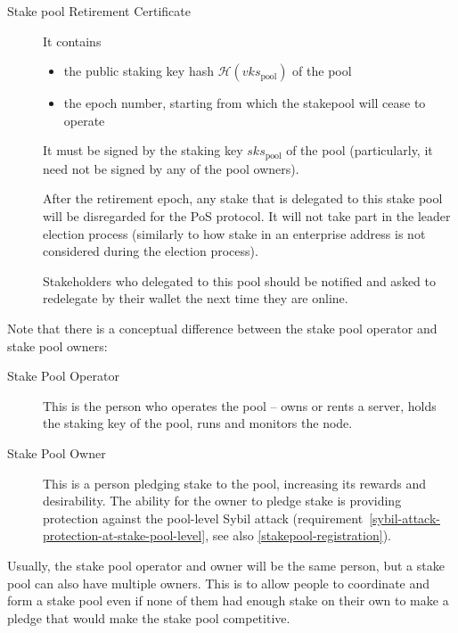 \documentclass[11pt,a4paper]{article}
\begin{document}
\begin{description}
\item[Stake pool Retirement Certificate]
It contains

\begin{itemize}
\item
  the public staking key hash \(\mathcal{H}(vks_\text{pool})\) of the
  pool
\item
  the epoch number, starting from which the stakepool will cease to
  operate
\end{itemize}

It must be signed by the staking key \(sks_\text{pool}\) of the pool
(particularly, it need not be signed by any of the pool owners).

After the retirement epoch, any stake that is delegated to this stake
pool will be disregarded for the PoS protocol. It will not take part in
the leader election process (similarly to how stake in an enterprise
address is not considered during the election process).

Stakeholders who delegated to this pool should be notified and asked to
redelegate by their wallet the next time they are online.
\end{description}

Note that there is a conceptual difference between the stake pool
operator and stake pool owners:
\begin{description}
\item[Stake Pool Operator] This is the person who operates the pool --
  owns or rents a server, holds the staking key of the pool, runs and
  monitors the node.
\item[Stake Pool Owner] This is a person pledging stake
  to the pool, increasing its rewards and desirability. The ability
  for the owner to pledge stake is providing protection against the
  pool-level Sybil attack
  (requirement~\ref{sybil-attack-protection-at-stake-pool-level}, see
  also \cref{stakepool-registration}).
\end{description}

Usually, the stake pool operator and owner will be the same person,
but a stake pool can also have multiple owners. This is to allow
people to coordinate and form a stake pool even if none of them had
enough stake on their own to make a pledge that would make the stake
pool competitive.
\end{document}
